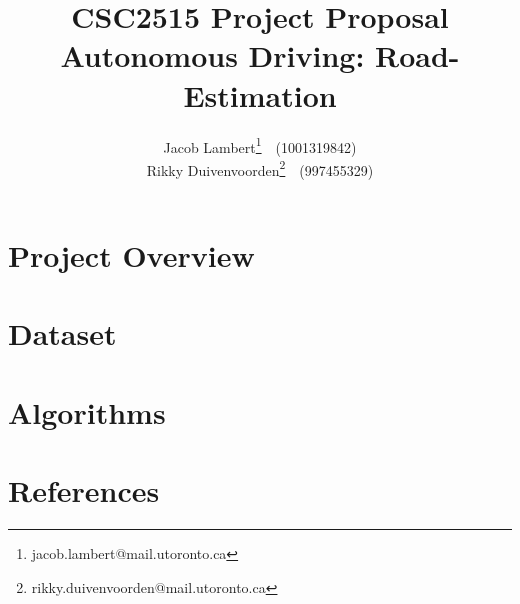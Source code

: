 \documentclass[a4paper,10pt]{article}
\title{\textbf{CSC2515 Project Proposal} \\
Autonomous Driving: Road-Estimation}
\author{
  Jacob Lambert\footnote{jacob.lambert@mail.utoronto.ca}~~(1001319842)\\
  Rikky Duivenvoorden\footnote{rikky.duivenvoorden@mail.utoronto.ca}~~(997455329) \\
}
\date{}
\begin{document}
\maketitle

\section{Project Overview}

\section{Dataset}

\section{Algorithms}

\section{References}
\end{document}
